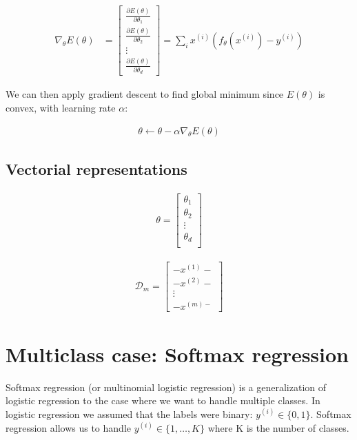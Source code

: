\begin{align}
	\nabla_\theta E(\theta) 
	&= 
	\begin{bmatrix}
		\frac{\partial E(\theta)}{\partial \theta_1}\\
		\frac{\partial E(\theta)}{\partial \theta_2}\\
		\vdots\\
		\frac{\partial E(\theta)}{\partial \theta_d}
	\end{bmatrix}
	=
		\sum_i x^{(i)} (f_\theta(x^{(i)}) - y^{(i)})
\end{align}

We can then apply gradient descent to find global minimum since $E(\theta)$ is convex, with learning rate $\alpha$:

\begin{align}
	\theta \leftarrow \theta - \alpha \nabla_\theta E(\theta)
\end{align}

\subsection{Vectorial representations}
\begin{align}
	\theta = \left[
	\begin{array}{cccc}
		\theta_{1} \\
		\theta_{2} \\
		\vdots\\
		\theta_{d} \\
	\end{array}\right]
\end{align}

\begin{align}
	\mathcal{D}_m = 
	\left[
		\begin{array}{cccc}
			- x^{(1)} - \\
			- x^{(2)} -  \\ 
			\vdots \\
			- x^{(m) - } 
		\end{array}
	\right]
\end{align}








\section{Multiclass case: Softmax regression}


Softmax regression (or multinomial logistic regression) is a generalization of logistic regression to the case where we want to handle multiple classes. In logistic regression we assumed that the labels were binary: $y^{(i)} \in \{0,1\}$. Softmax regression allows us to handle $ y^{(i)} \in \{1,\ldots,K\}$ where K is the number of classes.

